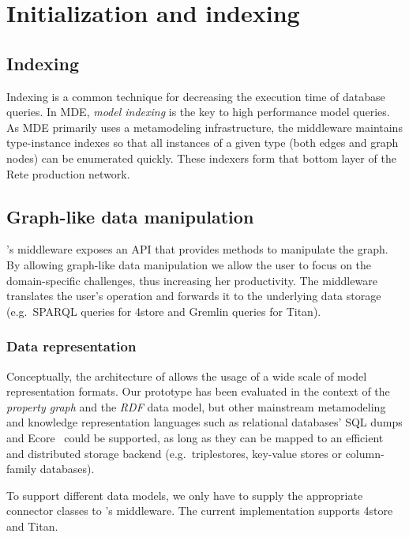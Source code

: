 \section{Initialization and indexing}
\label{sec:indexing}

\subsection{Indexing}

Indexing is a common technique for decreasing the execution time of database queries. In MDE, \emph{model indexing} is the key to high performance model queries. As MDE primarily uses a metamodeling infrastructure, the \iqd{} middleware maintains type-instance indexes so that all instances of a given type (both edges and graph nodes) can be enumerated quickly. These indexers form that bottom layer of the Rete production network. 

\subsection{Graph-like data manipulation}

\iqd{}'s middleware exposes an API that provides methods to manipulate the graph. By allowing graph-like data manipulation we allow the user to focus on the domain-specific challenges, thus increasing her productivity. The middleware translates the user's operation and forwards it to the underlying data storage (e.g.\ SPARQL queries for 4store and Gremlin queries for Titan).

\subsubsection{Data representation}

Conceptually, the architecture of \iqd{} allows the usage of a wide scale of model representation formats. Our prototype has been evaluated in the context of the \emph{property graph} and the \emph{RDF} data model, but other mainstream metamodeling and knowledge representation languages such as relational databases' SQL dumps and Ecore~\cite{EMF} could be supported, as long as they can be mapped to an efficient and distributed storage backend (e.g.\ triplestores, key-value stores or column-family databases).

To support different data models, we only have to supply the appropriate connector classes to \iqd{}'s middleware. The current implementation supports 4store and Titan. 

